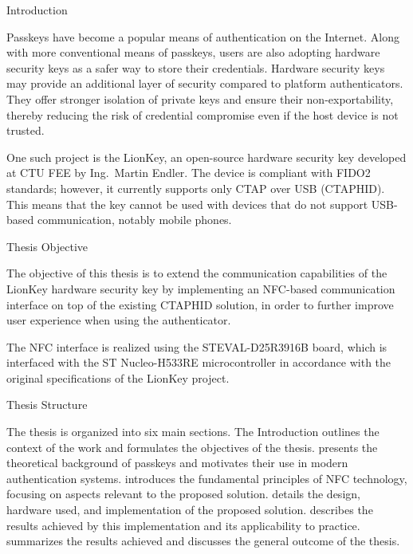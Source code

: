 \chap[introduction] Introduction

{\sbf Passkeys} have become a {\sbf popular means of authentication} on the Internet. Along with more conventional means of passkeys, users are also adopting {\sbf hardware security keys} as a {\sbf safer way to store their credentials}. Hardware security keys may provide an additional layer of security compared to platform authenticators. They offer stronger isolation of private keys and ensure their non-exportability, thereby reducing the risk of credential compromise even if the host device is not trusted.

\nl One such project is the {\sbf LionKey}, an open-source hardware security key developed at {\sbf CTU FEE} by {\sbf Ing.~Martin Endler}. The device is compliant with FIDO2 standards; however, it currently {\sbf supports only CTAP over USB} (CTAPHID). This means that the key cannot be used with devices that do not support USB-based communication, notably mobile phones.

\sec[objective] Thesis Objective

The objective of this thesis is to {\sbf extend} the {\sbf communication capabilities} of the LionKey hardware security key by {\sbf implementing an NFC-based communication} interface on top of the existing CTAPHID solution, in order to further improve user experience when using the authenticator.

\nl The NFC interface is realized using the {\sbf STEVAL-D25R3916B} board, which is interfaced with the ST {\sbf Nucleo-H533RE} microcontroller in accordance with the original specifications of the LionKey project.

\sec[structure] Thesis Structure

The thesis is organized into six main sections. 
\nl The {\sbf Introduction} outlines the context of the work and formulates the objectives of the thesis.
 presents the theoretical background of passkeys and motivates their use in modern authentication systems. 
 introduces the fundamental principles of NFC technology, focusing on aspects relevant to the proposed solution. 
 details the design, hardware used, and implementation of the proposed solution. 
 describes the results achieved by this implementation and its applicability to practice. 
 summarizes the results achieved and discusses the general outcome of the thesis.
